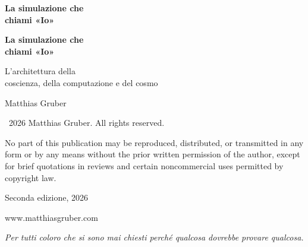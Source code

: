 \documentclass[11pt, twoside, openright]{book}
\makeatletter
\def\cleardoublepage{\clearpage\if@twoside \ifodd\c@page\else
  \thispagestyle{empty}\hbox{}\newpage
  \if@twocolumn\hbox{}\newpage\fi\fi\fi}
\makeatother
\begin{document}
\frontmatter
\pagestyle{empty}

\vspace*{3in}
\begin{center}
{\Huge\bfseries La simulazione che\\[0.3cm] chiami «Io»\par}
\end{center}
\cleardoublepage

\vspace*{2in}
\begin{center}
{\Huge\bfseries La simulazione che\\[0.3cm] chiami «Io»\par}
\vspace{0.8cm}
{\Large L'architettura della\\[0.2cm] coscienza, della computazione e del cosmo\par}
\vspace{2cm}
{\large Matthias Gruber\par}
\end{center}
\clearpage

\thispagestyle{empty}
\vspace*{\fill}
{\small
\noindent \textcopyright\ 2026 Matthias Gruber. All rights reserved.\par
\vspace{0.5cm}
\noindent No part of this publication may be reproduced, distributed, or transmitted
in any form or by any means without the prior written permission of the author,
except for brief quotations in reviews and certain noncommercial uses
permitted by copyright law.\par
\vspace{0.5cm}

\vspace{0.5cm}
\noindent Seconda edizione, 2026\par
\vspace{0.5cm}
\noindent www.matthiasgruber.com\par
}
\cleardoublepage

\thispagestyle{empty}
\vspace*{3in}
\begin{center}
\textit{Per tutti coloro che si sono mai chiesti perché qualcosa dovrebbe provare qualcosa.}
\end{center}
\cleardoublepage
\end{document}
